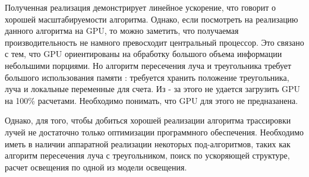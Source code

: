 \documentclass[12pt, a4paper, utf8]{article}
\begin{document}
Полученная реализация демонстрирует линейное ускорение, что говорит о хорошей масштабируемости алгоритма. Однако, если посмотреть на реализацию данного алгоритма на GPU, то можно заметить, что получаемая производительность не намного превосходит центральный процессор. Это связано с тем, что GPU ориентированы на обработку большого объема информации небольшими порциями. Но алгоритм пересечения луча и треугольника требует большого использования памяти : требуется хранить положение треугольника, луча и локальные переменные для счета. Из - за этого не удается загрузить GPU на 100\% расчетами. Необходимо понимать, что GPU для этого не предназанена.

Однако, для того, чтобы добиться хорошей реализации алгоритма трассировки лучей не достаточно только оптимизации программного обеспечения. Необходимо иметь в наличии аппаратной реализации некоторых под-алгоритмов, таких как алгоритм пересечения луча с треугольником, поиск по ускоряющей структуре, расчет освещения по одной из модели освещения.

\end{document}
